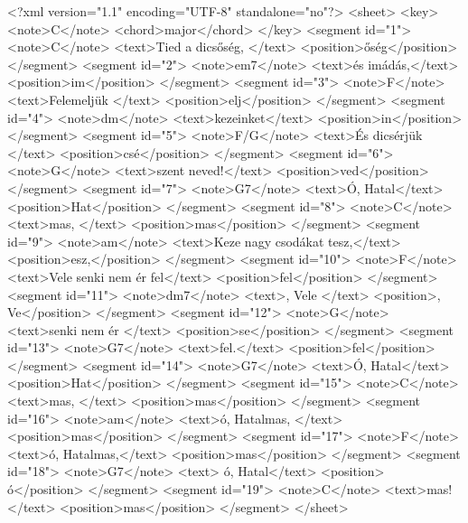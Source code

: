 \begin{xml}
<?xml version="1.1" encoding="UTF-8" standalone="no"?>
  <sheet>
    <key>
      <note>C</note>
      <chord>major</chord>
    </key>
    <segment id="1">
      <note>C</note>
      <text>Tied a dicsőség, </text>
      <position>őség</position>
    </segment>
    <segment id="2">
      <note>em7</note>
      <text>és imádás,\n</text>
      <position>im</position>
    </segment>
    <segment id="3">
      <note>F</note>
      <text>Felemeljük </text>
      <position>elj</position>
    </segment>
    <segment id="4">
      <note>dm</note>
      <text>kezeinket\n</text>
      <position>in</position>
    </segment>
    <segment id="5">
      <note>F/G</note>
      <text>És dicsérjük </text>
      <position>csé</position>
    </segment>
    <segment id="6">
      <note>G</note>
      <text>szent neved!\n</text>
      <position>ved</position>
    </segment>
    <segment id="7">
      <note>G7</note>
      <text>Ó, Hatal</text>
      <position>Hat</position>
    </segment>
    <segment id="8">
      <note>C</note>
      <text>mas, </text>
      <position>mas</position>
    </segment>
    <segment id="9">
      <note>am</note>
      <text>Keze nagy csodákat tesz,\n</text>
      <position>esz,</position>
    </segment>
    <segment id="10">
      <note>F</note>
      <text>Vele senki nem ér fel</text>
      <position>fel</position>
    </segment>
    <segment id="11">
      <note>dm7</note>
      <text>, Vele </text>
      <position>, Ve</position>
    </segment>
    <segment id="12">
      <note>G</note>
      <text>senki nem ér </text>
      <position>se</position>
    </segment>
    <segment id="13">
      <note>G7</note>
      <text>fel.\n</text>
      <position>fel</position>
    </segment>
    <segment id="14">
      <note>G7</note>
      <text>Ó, Hatal</text>
      <position>Hat</position>
    </segment>
    <segment id="15">
      <note>C</note>
      <text>mas, </text>
      <position>mas</position>
    </segment>
    <segment id="16">
      <note>am</note>
      <text>ó, Hatalmas, </text>
      <position>mas</position>
    </segment>
    <segment id="17">
      <note>F</note>
      <text>ó, Hatalmas,</text>
      <position>mas</position>
    </segment>
    <segment id="18">
      <note>G7</note>
      <text> ó, Hatal</text>
      <position> ó</position>
    </segment>
    <segment id="19">
      <note>C</note>
      <text>mas!</text>
      <position>mas</position>
    </segment>
  </sheet>

\end{xml}

